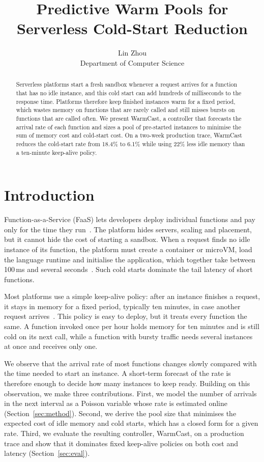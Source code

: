 \documentclass[10pt]{article}
\title{Predictive Warm Pools for Serverless Cold-Start Reduction}
\author{Lin Zhou\\Department of Computer Science}
\date{}
\begin{document}
\maketitle

\begin{abstract}
Serverless platforms start a fresh sandbox whenever a request arrives for a
function that has no idle instance, and this cold start can add hundreds of
milliseconds to the response time. Platforms therefore keep finished instances
warm for a fixed period, which wastes memory on functions that are rarely
called and still misses bursts on functions that are called often. We present
WarmCast, a controller that forecasts the arrival rate of each function and
sizes a pool of pre-started instances to minimise the sum of memory cost and
cold-start cost. On a two-week production trace, WarmCast reduces the
cold-start rate from 18.4\% to 6.1\% while using 22\% less idle memory than a
ten-minute keep-alive policy.
\end{abstract}

\section{Introduction}
\label{sec:intro}

Function-as-a-Service (FaaS) lets developers deploy individual functions and
pay only for the time they run~\cite{jonas2019cloud}. The platform hides
servers, scaling and placement, but it cannot hide the cost of starting a
sandbox. When a request finds no idle instance of its function, the platform
must create a container or microVM, load the language runtime and initialise
the application, which together take between 100\,ms and several
seconds~\cite{wang2018peeking,oakes2018sock}. Such cold starts dominate the
tail latency of short functions.

Most platforms use a simple keep-alive policy: after an instance finishes a
request, it stays in memory for a fixed period, typically ten minutes, in case
another request arrives~\cite{shahrad2020serverless}. This policy is easy to
deploy, but it treats every function the same. A function invoked once per
hour holds memory for ten minutes and is still cold on its next call, while a
function with bursty traffic needs several instances at once and receives
only one.

We observe that the arrival rate of most functions changes slowly compared
with the time needed to start an instance. A short-term forecast of the rate
is therefore enough to decide how many instances to keep ready. Building on
this observation, we make three contributions. First, we model the number of
arrivals in the next interval as a Poisson variable whose rate is estimated
online (Section~\ref{sec:method}). Second, we derive the pool size that
minimises the expected cost of idle memory and cold starts, which has a
closed form for a given rate. Third, we evaluate the resulting controller,
WarmCast, on a production trace and show that it dominates fixed keep-alive
policies on both cost and latency (Section~\ref{sec:eval}).
\end{document}
